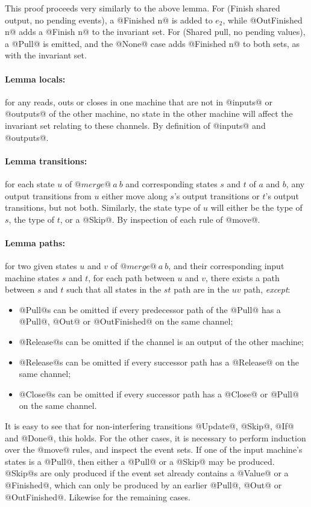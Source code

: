 This proof proceeds very similarly to the above lemma.
For (Finish shared output, no pending events), a @Finished n@ is added to $e_2$, while @OutFinished n@ adds a @Finish n@ to the invariant set.
For (Shared pull, no pending values), a @Pull@ is emitted, and the @None@ case adds @Finished n@ to both sets, as with the invariant set.


\paragraph{Lemma locals:} for any reads, outs or closes in one machine that are not in @inputs@ or @outputs@ of the other machine, no state in the other machine will affect the invariant set relating to these channels.
By definition of @inputs@ and @outputs@.

\paragraph{Lemma transitions:} for each state $u$ of $@merge@~a~b$ and corresponding states $s$ and $t$ of $a$ and $b$, any output transitions from $u$ either move along $s$'s output transitions or $t$'s output transitions, but not both.
Similarly, the state type of $u$ will either be the type of $s$, the type of $t$, or a @Skip@.
By inspection of each rule of @move@.

\paragraph{Lemma paths:} for two given states $u$ and $v$ of $@merge@~a~b$, and their corresponding input machine states $s$ and $t$, for each path between $u$ and $v$, there exists a path between $s$ and $t$ such that all states in the $st$ path are in the $uv$ path, \emph{except}:
\begin{itemize}
\item @Pull@s can be omitted if every predecessor path of the @Pull@ has a @Pull@, @Out@ or @OutFinished@ on the same channel;
\item @Release@s can be omitted if the channel is an output of the other machine;
\item @Release@s can be omitted if every successor path has a @Release@ on the same channel;
\item @Close@s can be omitted if every successor path has a @Close@ or @Pull@ on the same channel.
\end{itemize}

It is easy to see that for non-interfering transitions @Update@, @Skip@, @If@ and @Done@, this holds.
For the other cases, it is necessary to perform induction over the @move@ rules, and inspect the event sets.
If one of the input machine's states is a @Pull@, then either a @Pull@ or a @Skip@ may be produced.
@Skip@s are only produced if the event set already contains a @Value@ or a @Finished@, which can only be produced by an earlier @Pull@, @Out@ or @OutFinished@.
Likewise for the remaining cases.


